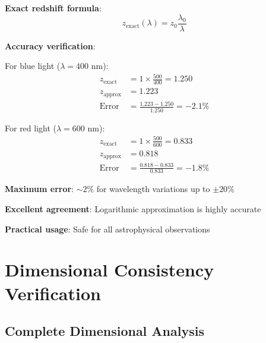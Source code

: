 \documentclass[12pt,a4paper]{article}
\begin{document}
	\textbf{Exact redshift formula}:
	\begin{equation}
		z_{\text{exact}}(\lambda) = z_0 \frac{\lambda_0}{\lambda}
		\label{eq:exact_redshift_formula}
	\end{equation}
	
	\textbf{Accuracy verification}:
	
	For blue light ($\lambda = 400$ nm):
	\begin{align}
		z_{\text{exact}} &= 1 \times \frac{500}{400} = 1.250 \\
		z_{\text{approx}} &= 1.223 \\
		\text{Error} &= \frac{1.223 - 1.250}{1.250} = -2.1\%
	\end{align}
	
	For red light ($\lambda = 600$ nm):
	\begin{align}
		z_{\text{exact}} &= 1 \times \frac{500}{600} = 0.833 \\
		z_{\text{approx}} &= 0.818 \\
		\text{Error} &= \frac{0.818 - 0.833}{0.833} = -1.8\%
	\end{align}
	
	\begin{tcolorbox}[colback=blue!5!white,colframe=blue!75!black,title=Approximation Accuracy]
		\textbf{Maximum error}: $\sim 2\%$ for wavelength variations up to $\pm 20\%$
		
		\textbf{Excellent agreement}: Logarithmic approximation is highly accurate
		
		\textbf{Practical usage}: Safe for all astrophysical observations
	\end{tcolorbox}
	
	\section{Dimensional Consistency Verification}
	\label{sec:dimensional_verification}
	
	\subsection{Complete Dimensional Analysis}
	\label{subsec:complete_dimensional_analysis}
	
\end{document}
